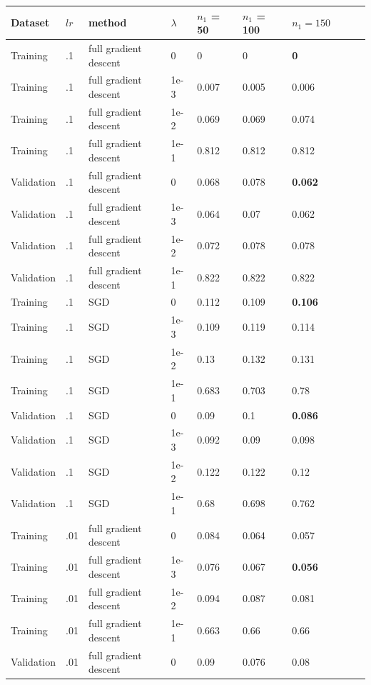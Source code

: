 \documentclass[10pt]{article}
\begin{document}
\begin{table}
\centering
\begin{tabular}{llllllllll}
\toprule
Dataset & $lr$ & method & $\lambda$ & $n_1$ = 50 & $n_1$ = 100 & $n_1 = 150$ \\
\midrule
Training & .1 & full gradient descent &  0 & 0     & 0     & \bf{0}     \\
Training & .1 & full gradient descent & 1e-3 & 0.007 & 0.005 & 0.006 \\
Training & .1 & full gradient descent & 1e-2 & 0.069 & 0.069 & 0.074 \\
Training & .1 & full gradient descent & 1e-1 & 0.812 & 0.812 & 0.812 \\
\midrule
Validation & .1 & full gradient descent &  0 & 0.068 & 0.078 & \bf{0.062} \\
Validation & .1 & full gradient descent & 1e-3 &  0.064 & 0.07  & 0.062 \\
Validation & .1 & full gradient descent & 1e-2 & 0.072 & 0.078 & 0.078 \\
Validation & .1 & full gradient descent & 1e-1 & 0.822 & 0.822 & 0.822 \\
\midrule
Training & .1 & SGD &  0 & 0.112 & 0.109 & \bf{0.106} \\
Training & .1 & SGD & 1e-3 & 0.109 & 0.119 & 0.114 \\
Training & .1 & SGD & 1e-2 & 0.13  & 0.132 & 0.131 \\
Training & .1 & SGD & 1e-1 & 0.683 & 0.703 & 0.78  \\
\midrule
Validation & .1 & SGD &  0 & 0.09  & 0.1   & \bf{0.086} \\
Validation & .1 & SGD & 1e-3 & 0.092 & 0.09  & 0.098 \\
Validation & .1 & SGD & 1e-2 & 0.122 & 0.122 & 0.12  \\
Validation & .1 & SGD & 1e-1 & 0.68  & 0.698 & 0.762 \\
\midrule
Training & .01 & full gradient descent &  0 & 0.084 & 0.064 & 0.057 \\
Training & .01 & full gradient descent &  1e-3 & 0.076 & 0.067 & \bf{0.056} \\
Training & .01 & full gradient descent &  1e-2 & 0.094 & 0.087 & 0.081 \\
Training & .01 & full gradient descent & 1e-1 & 0.663 & 0.66  & 0.66  \\
\midrule
Validation & .01 & full gradient descent &  0 & 0.09  & 0.076 & 0.08  \\

\end{tabular}
\end{table}
\end{document}
